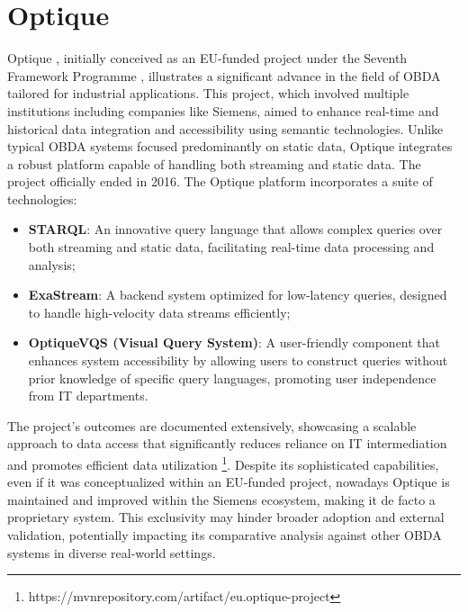 \section{Optique}
Optique \cite{DBLP:journals/ws/KharlamovMSXKR19}, initially conceived as an EU-funded project under the Seventh Framework Programme \cite{DBLP:journals/ijtm/LytrasSP09}, illustrates a significant advance in the field of \ac{OBDA} tailored for industrial applications. 
This project, which involved multiple institutions including companies like Siemens, aimed to enhance real-time and historical data integration and accessibility using semantic technologies. Unlike typical \ac{OBDA} systems focused predominantly on static data, Optique integrates a robust platform capable of handling both streaming and static data. The project officially ended in 2016.
The Optique platform incorporates a suite of technologies: 
\begin{itemize} 
\item \textbf{STARQL}: An innovative query language that allows complex queries over both streaming and static data, facilitating real-time data processing and analysis;
\item \textbf{ExaStream}: A backend system optimized for low-latency queries, designed to handle high-velocity data streams efficiently;
\item \textbf{OptiqueVQS (Visual Query System)}: A user-friendly component that enhances system accessibility by allowing users to construct queries without prior knowledge of specific query languages, promoting user independence from IT departments. 
\end{itemize}
The project's outcomes are documented extensively, showcasing a scalable approach to data access that significantly reduces reliance on IT intermediation and promotes efficient data utilization \footnote{https://mvnrepository.com/artifact/eu.optique-project}.
Despite its sophisticated capabilities, even if it was conceptualized within an EU-funded project, nowadays Optique is maintained and improved within the Siemens ecosystem, making it de facto a proprietary system. This exclusivity may hinder broader adoption and external validation, potentially impacting its comparative analysis against other \ac{OBDA} systems in diverse real-world settings.
